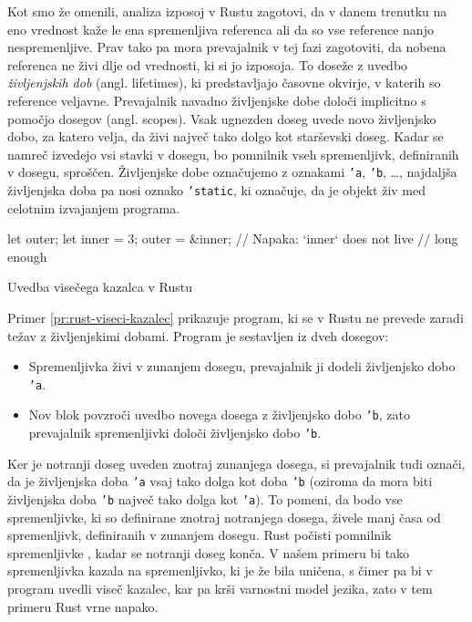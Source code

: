 Kot smo že omenili, analiza izposoj v Rustu zagotovi, da v danem trenutku na eno vrednost kaže le ena spremenljiva referenca ali da so vse reference nanjo nespremenljive. Prav tako pa mora prevajalnik v tej fazi zagotoviti, da nobena referenca ne živi dlje od vrednosti, ki si jo izposoja. To doseže z uvedbo \textit{življenjskih dob} (angl. lifetimes), ki predstavljajo časovne okvirje, v katerih so reference veljavne. Prevajalnik navadno življenjske dobe določi implicitno s pomočjo dosegov (angl. scopes). Vsak ugnezden doseg uvede novo življenjsko dobo, za katero velja, da živi največ tako dolgo kot starševski doseg. Kadar se namreč izvedejo vsi stavki v dosegu, bo pomnilnik vseh spremenljivk, definiranih v dosegu, sproščen. Življenjske dobe označujemo z oznakami \texttt{'a}, \texttt{'b}, \dots, najdaljša življenjska doba pa nosi oznako \texttt{'static}, ki označuje, da je objekt živ med celotnim izvajanjem programa.

\begin{primer}[ht]
\centering
\begin{rust-failure}
let outer;
{
    let inner = 3;
    outer = &inner;  // Napaka: `inner` does not live
                     // long enough
}
\end{rust-failure}
\caption{Uvedba visečega kazalca v Rustu}
\label{pr:rust-viseci-kazalec}
\end{primer}

Primer \ref{pr:rust-viseci-kazalec} prikazuje program, ki se v Rustu ne prevede zaradi težav z življenjskimi dobami. Program je sestavljen iz dveh dosegov:
\begin{itemize}
	\itemsep 0em
	\item Spremenljivka  živi v zunanjem dosegu, prevajalnik ji dodeli živ\-ljen\-jsko dobo \texttt{'a}.
	\item Nov blok povzroči uvedbo novega dosega z živ\-ljenj\-sko dobo \texttt{'b}, zato prevajalnik spremenljivki  določi živ\-ljenj\-sko dobo \texttt{'b}.
\end{itemize}

Ker je notranji doseg uveden znotraj zunanjega dosega, si prevajalnik tudi označi, da je življenjska doba \texttt{'a} vsaj tako dolga kot doba \texttt{'b} (oziroma da mora biti življenjska doba \texttt{'b} največ tako dolga kot \texttt{'a}). To pomeni, da bodo vse spremenljivke, ki so definirane znotraj notranjega dosega, živele manj časa od spremenljivk, definiranih v zunanjem dosegu. Rust počisti pomnilnik spremenljivke , kadar se notranji doseg konča. V našem primeru bi tako spremenljivka  kazala na spremenljivko, ki je že bila uničena, s čimer pa bi v program uvedli viseč kazalec, kar pa krši varnostni model jezika, zato v tem primeru Rust vrne napako.

